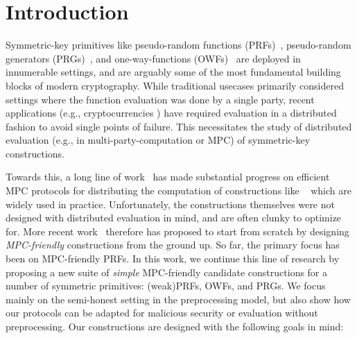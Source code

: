 
\section{Introduction}
\label{sec:introduction}



\medskip

Symmetric-key primitives like pseudo-random functions (PRFs)~\cite{goldreich1984-prf}, pseudo-random generators (PRGs)~\cite{?}, and one-way-functions (OWFs)~\cite{?} are deployed in innumerable settings, and are arguably some of the most fundamental building blocks of modern cryptography. While traditional usecases primarily considered settings where the function evaluation was done by a single party, recent applications (e.g., cryptocurrencies ) have required evaluation in a distributed fashion to avoid single points of failure. This necessitates the study of distributed evaluation (e.g., in multi-party-computation or MPC) of symmetric-key constructions. 

Towards this, a long line of work~\cite{?} has made substantial progress on efficient MPC protocols for distributing the computation of constructions like ~\cite{?} which are widely used in practice. Unfortunately, the constructions themselves were not designed with distributed evaluation in mind, and are often clunky to optimize for. More recent work~\cite{grassi2016-mpcfriendly, boneh2018-darkmatter} therefore has proposed to start from scratch by designing \textit{MPC-friendly} constructions from the ground up. So far, the primary focus has been on MPC-friendly PRFs. In this work, we continue this line of research by proposing a new suite of \textit{simple} MPC-friendly candidate constructions for a number of symmetric primitives: (weak)PRFs, OWFs, and PRGs. We focus mainly on the semi-honest setting in the preprocessing model, but also show how our protocols can be adapted for malicious security or evaluation without preprocessing. Our constructions are designed with the following goals in mind:

